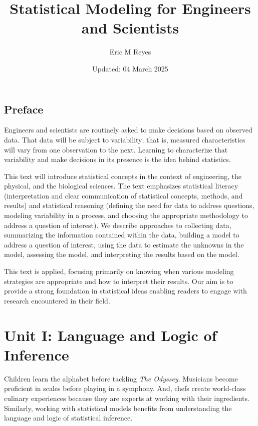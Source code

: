 \documentclass[
  letterpaper,
  DIV=11,
  numbers=noendperiod]{scrreprt}
\title{Statistical Modeling for Engineers and Scientists}
\author{Eric M Reyes}
\date{Updated: 04 March 2025}
\renewcommand*\contentsname{Table of contents}
\newcommand\contentsname{Table of contents}
\theoremstyle{definition}
\theoremstyle{definition}
\theoremstyle{plain}
\theoremstyle{remark}
\begin{document}
\maketitle

\renewcommand*\contentsname{Table of contents}
{
\hypersetup{linkcolor=}
\setcounter{tocdepth}{2}
\tableofcontents
}


\chapter*{Preface}\label{preface}


Engineers and scientists are routinely asked to make decisions based on
observed data. That data will be subject to variability; that is,
measured characteristics will vary from one observation to the next.
Learning to characterize that variability and make decisions in its
presence is the idea behind statistics.

This text will introduce statistical concepts in the context of
engineering, the physical, and the biological sciences. The text
emphasizes statistical literacy (interpretation and clear communication
of statistical concepts, methods, and results) and statistical reasoning
(defining the need for data to address questions, modeling variability
in a process, and choosing the appropriate methodology to address a
question of interest). We describe approaches to collecting data,
summarizing the information contained within the data, building a model
to address a question of interest, using the data to estimate the
unknowns in the model, assessing the model, and interpreting the results
based on the model.

This text is applied, focusing primarily on knowing when various
modeling strategies are appropriate and how to interpret their results.
Our aim is to provide a strong foundation in statistical ideas enabling
readers to engage with research encountered in their field.

\part{Unit I: Language and Logic of Inference}

Children learn the alphabet before tackling \emph{The Odyssey}.
Musicians become proficient in scales before playing in a symphony. And,
chefs create world-class culinary experiences because they are experts
at working with their ingredients. Similarly, working with statistical
models benefits from understanding the language and logic of statistical
inference.
\end{document}
